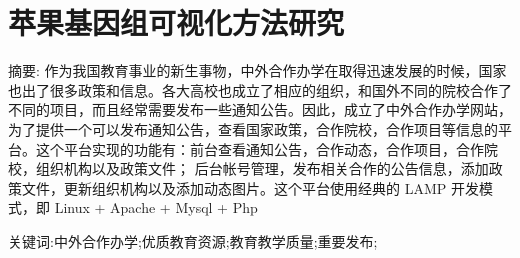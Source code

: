 \chapter*{苹果基因组可视化方法研究}
\vspace{1em}
{\large {\heiti 摘要: }}\normalsize{\songti 作为我国教育事业的新生事物，中外合作办学在取得迅速发展的时候，国家也出了很多政策和信息。各大高校也成立了相应的组织，和国外不同的院校合作了不同的项目，而且经常需要发布一些通知公告。因此，成立了中外合作办学网站，为了提供一个可以发布通知公告，查看国家政策，合作院校，合作项目等信息的平台。这个平台实现的功能有：前台查看通知公告，合作动态，合作项目，合作院校，组织机构以及政策文件； 后台帐号管理，发布相关合作的公告信息，添加政策文件，更新组织机构以及添加动态图片。这个平台使用经典的 LAMP 开发模式，即 Linux + Apache + Mysql + Php}

{\large {\heiti 关键词:}}\normalsize{中外合作办学;优质教育资源;教育教学质量;重要发布;}
